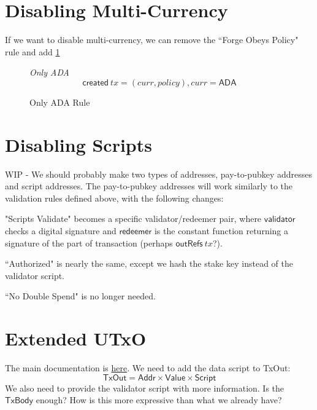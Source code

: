 \documentclass[11pt,a4paper]{article}
\newcommand{\var}[1]{\mathit{#1}}
\newcommand{\fun}[1]{\mathsf{#1}}
\newcommand{\type}[1]{\mathsf{#1}}
\newcommand{\Script}{\type{Script}}
\newcommand{\Addr}{\type{Addr}}
\newcommand{\Value}{\type{Value}}
\newcommand{\TxOut}{\type{TxOut}}
\newcommand{\TxBody}{\type{TxBody}}
\newcommand{\created}[1]{\fun{created}\ \var{#1}}
\newcommand{\outRefs}[1]{\fun{outRefs}\ \var{#1}}
\begin{document}
\section{Disabling Multi-Currency}

If we want to disable multi-currency, we can remove the ``Forge Obeys Policy" rule and
add \cref{fig:only_ada_rule}
\begin{figure}
\emph{Only ADA}
%
\begin{equation*}
\created tx = (curr, policy), curr = \mathsf{ADA}
\end{equation*}

\caption{Only ADA Rule}
\label{fig:only_ada_rule}
\end{figure}


\section{Disabling Scripts}

WIP - We should probably make two types of addresses, pay-to-pubkey addresses and script addresses.
The pay-to-pubkey addresses will work similarly to the validation rules defined above, with the
following changes:

"Scripts Validate" becomes a specific validator/redeemer pair, where $\mathsf{validator}$ checks a
digital signature and $\mathsf{redeemer}$ is the constant function returning a signature of the
part of transaction (perhaps $\outRefs tx$?).

``Authorized" is nearly the same, except we hash the stake key instead of the validator script.

``No Double Spend" is no longer needed.

\section{Extended UTxO}

The main documentation is \href{https://github.com/input-output-hk/plutus/tree/master/docs/extended-utxo}{here}.
We need to add the data script to TxOut:
$$ \TxOut = \Addr \times \Value \times \Script $$
We also need to provide the validator script with more information.  Is the $\TxBody$ enough?
How is this more expressive than what we already have?



\end{document}

